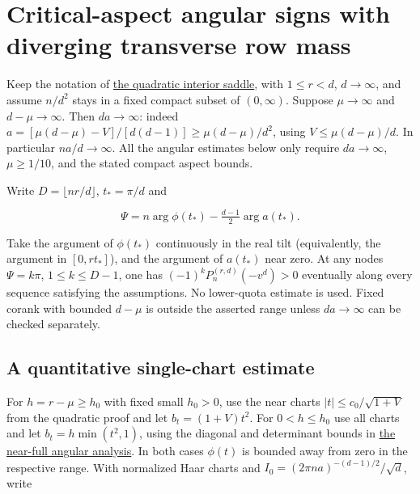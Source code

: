 \section{Critical-aspect angular signs with diverging transverse row mass}\label{sec:critical-aspect-angular-nodes}

Keep the notation of \href{https://github.com/ProgramComputer/open-math-research/blob/4fb624ba937a8eecc1361a6066185cd81ab7b172/topics/balanced-arrays/quadratic/very-tall-quadratic-interior-saddle.md}{the quadratic interior saddle}, with $1\le r<d$, $d\to\infty$, and assume $n/d^2$ stays in a fixed compact subset of $(0,\infty)$. Suppose $\mu\to\infty$ and $d-\mu\to\infty$. Then $da\to\infty$: indeed $a=[\mu(d-\mu)-V]/[d(d-1)]\ge\mu(d-\mu)/d^2$, using $V\le\mu(d-\mu)/d$. In particular $na/d\to\infty$. All the angular estimates below only require $da\to\infty$, $\mu\ge1/10$, and the stated compact aspect bounds.

Write $D=\lfloor nr/d\rfloor$, $t_*=\pi/d$ and

\begin{equation*}
\Psi=n\arg\phi(t_*)-\tfrac{d-1}{2}\arg a(t_*).
\end{equation*}

Take the argument of $\phi(t_*)$ continuously in the real tilt (equivalently, the argument in $[0,r t_*]$), and the argument of $a(t_*)$ near zero. At any nodes $\Psi=k\pi$, $1\le k\le D-1$, one has $(-1)^kP_n^{(r,d)}(-v^d)>0$ eventually along every sequence satisfying the assumptions. No lower-quota estimate is used. Fixed corank with bounded $d-\mu$ is outside the asserted range unless $da\to\infty$ can be checked separately.

\subsection{A quantitative single-chart estimate}

For $h=r-\mu\ge h_0$ with fixed small $h_0>0$, use the near charts $|t|\le c_0/\sqrt{1+V}$ from the quadratic proof and let $b_t=(1+V)t^2$. For $0<h\le h_0$ use all charts and let $b_t=h\min(t^2,1)$, using the diagonal and determinant bounds in \href{https://github.com/ProgramComputer/open-math-research/blob/4fb624ba937a8eecc1361a6066185cd81ab7b172/topics/balanced-arrays/quadratic/near-full-all-angular-signs.md}{the near-full angular analysis}. In both cases $\phi(t)$ is bounded away from zero in the respective range. With normalized Haar charts and $I_0=(2\pi n a)^{-(d-1)/2}/\sqrt d$, write

